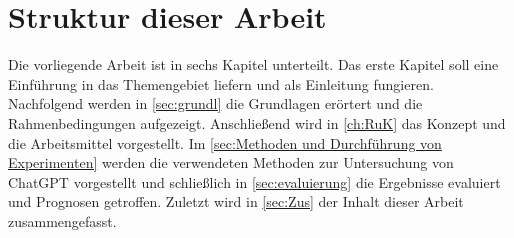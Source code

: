 \section{Struktur dieser Arbeit}
Die vorliegende Arbeit ist in sechs Kapitel unterteilt. Das erste Kapitel soll eine Einführung in das Themengebiet liefern und als Einleitung fungieren. Nachfolgend werden in \autoref{sec:grundl} die Grundlagen erörtert und die Rahmenbedingungen aufgezeigt. Anschließend wird in \autoref{ch:RuK} das Konzept und die Arbeitsmittel vorgestellt. Im \autoref{sec:Methoden und Durchführung von Experimenten} werden die verwendeten Methoden zur Untersuchung von ChatGPT vorgestellt und schließlich in \autoref{sec:evaluierung} die Ergebnisse evaluiert und Prognosen getroffen. Zuletzt wird in \autoref{sec:Zus} der Inhalt dieser Arbeit zusammengefasst.

